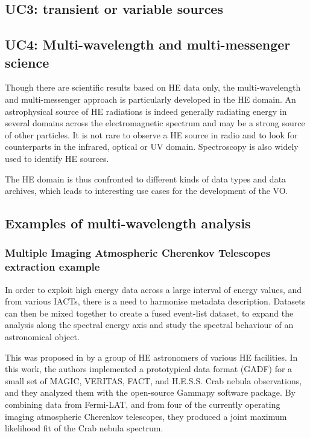 \documentclass[11pt,a4paper]{ivoa}
\begin{document}


\subsection{UC3: transient or variable sources}




\subsection{UC4: Multi-wavelength and multi-messenger science}

Though there are scientific results based on HE data only, the multi-wavelength and multi-messenger approach is particularly developed in the HE domain. An astrophysical source of HE radiations is indeed generally radiating energy in several domains across the electromagnetic spectrum and may be a strong source of other particles. It is not rare to observe a HE source in radio and to look for counterparts in the infrared, optical or UV domain. Spectroscopy is also widely used to identify HE sources.

The HE domain is thus confronted to different kinds of data types and data archives, which leads to interesting use cases for the development of the VO.



\subsection{Examples of multi-wavelength analysis}

\subsubsection{Multiple Imaging Atmospheric Cherenkov Telescopes extraction example}

In order to exploit high energy data across a large interval of energy values, and from various IACTs, there is a need to harmonise metadata description.
Datasets can then be mixed together to create a fused event-list dataset, to expand the analysis along the spectral energy axis and study the spectral behaviour of an astronomical object.

This was proposed in \citep{2019A&A...625A..10N} by a group of HE astronomers of various HE facilities.
In this work, the authors implemented a prototypical data format (GADF) for a small set of MAGIC, VERITAS, FACT, and H.E.S.S. Crab nebula observations, and they analyzed them with the open-source Gammapy software package. By combining data from Fermi-LAT, and from four of the currently operating imaging atmospheric Cherenkov telescopes, they produced a joint maximum likelihood fit of the Crab nebula spectrum.
\end{document}
